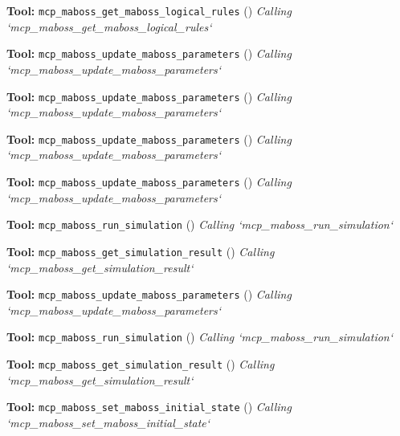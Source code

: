 \documentclass[11pt,a4paper]{article}
\begin{document}
\begin{toolokbox}
\textbf{Tool:} \texttt{mcp\_maboss\_get\_maboss\_logical\_rules} (\checkmark)
\textit{Calling `mcp\_maboss\_get\_maboss\_logical\_rules`}
\end{toolokbox}
\begin{toolokbox}
\textbf{Tool:} \texttt{mcp\_maboss\_update\_maboss\_parameters} (\checkmark)
\textit{Calling `mcp\_maboss\_update\_maboss\_parameters`}
\end{toolokbox}
\begin{toolokbox}
\textbf{Tool:} \texttt{mcp\_maboss\_update\_maboss\_parameters} (\checkmark)
\textit{Calling `mcp\_maboss\_update\_maboss\_parameters`}
\end{toolokbox}
\begin{toolokbox}
\textbf{Tool:} \texttt{mcp\_maboss\_update\_maboss\_parameters} (\checkmark)
\textit{Calling `mcp\_maboss\_update\_maboss\_parameters`}
\end{toolokbox}
\begin{toolokbox}
\textbf{Tool:} \texttt{mcp\_maboss\_update\_maboss\_parameters} (\checkmark)
\textit{Calling `mcp\_maboss\_update\_maboss\_parameters`}
\end{toolokbox}
\begin{toolokbox}
\textbf{Tool:} \texttt{mcp\_maboss\_run\_simulation} (\checkmark)
\textit{Calling `mcp\_maboss\_run\_simulation`}
\end{toolokbox}
\begin{toolokbox}
\textbf{Tool:} \texttt{mcp\_maboss\_get\_simulation\_result} (\checkmark)
\textit{Calling `mcp\_maboss\_get\_simulation\_result`}
\end{toolokbox}
\begin{toolokbox}
\textbf{Tool:} \texttt{mcp\_maboss\_update\_maboss\_parameters} (\checkmark)
\textit{Calling `mcp\_maboss\_update\_maboss\_parameters`}
\end{toolokbox}
\begin{toolokbox}
\textbf{Tool:} \texttt{mcp\_maboss\_run\_simulation} (\checkmark)
\textit{Calling `mcp\_maboss\_run\_simulation`}
\end{toolokbox}
\begin{toolokbox}
\textbf{Tool:} \texttt{mcp\_maboss\_get\_simulation\_result} (\checkmark)
\textit{Calling `mcp\_maboss\_get\_simulation\_result`}
\end{toolokbox}
\begin{toolokbox}
\textbf{Tool:} \texttt{mcp\_maboss\_set\_maboss\_initial\_state} (\checkmark)
\textit{Calling `mcp\_maboss\_set\_maboss\_initial\_state`}
\end{toolokbox}
\end{document}
